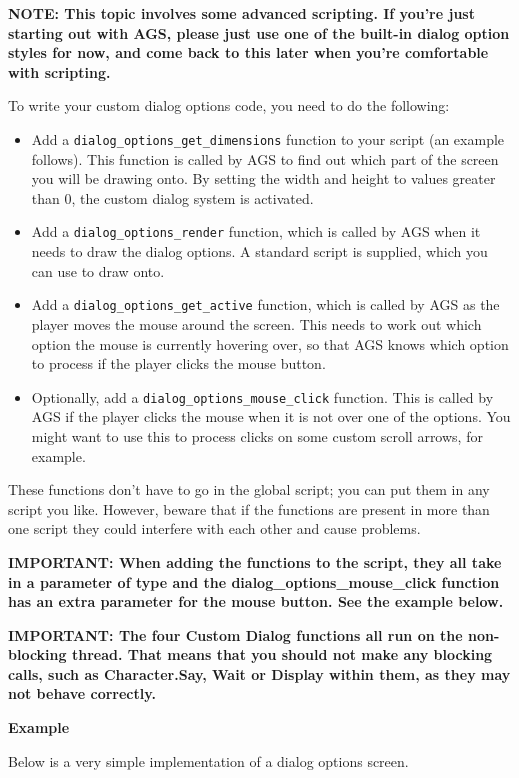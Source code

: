 \bf{NOTE:} This topic involves some advanced scripting. If you're just starting out with AGS,
please just use one of the built-in dialog option styles for now, and come back to this later
when you're comfortable with scripting.

To write your custom dialog options code, you need to do the following:
\begin{itemize}
\item Add a \verb$dialog_options_get_dimensions$ function to your script (an example follows).
This function is called by AGS to find out which part of the screen you will be drawing onto.
By setting the width and height to values greater than 0, the custom dialog system is activated.
\item Add a \verb$dialog_options_render$ function, which is called by AGS when it needs to
draw the dialog options. A standard script  is
supplied, which you can use to draw onto.
\item Add a \verb$dialog_options_get_active$ function, which is called by AGS as the player moves
the mouse around the screen. This needs to work out which option the mouse is currently hovering
over, so that AGS knows which option to process if the player clicks the mouse button.
\item Optionally, add a \verb$dialog_options_mouse_click$ function. This is called by AGS if the
player clicks the mouse when it is not over one of the options. You might want to use this to
process clicks on some custom scroll arrows, for example.
\end{itemize}
These functions don't have to go in the global script; you can put them in any script you like.
However, beware that if the functions are present in more than one script they could interfere
with each other and cause problems.

\bf{IMPORTANT:} When adding the functions to the script, they all take in a parameter of
type  and the
dialog_options_mouse_click function has an extra parameter for the mouse button. See the example below.

\bf{IMPORTANT:} The four Custom Dialog functions all run on the non-blocking thread. That means
that you should not make any blocking calls, such as Character.Say, Wait or Display within them,
as they may not behave correctly.

\bf{Example}

Below is a very simple implementation of a dialog options screen.

